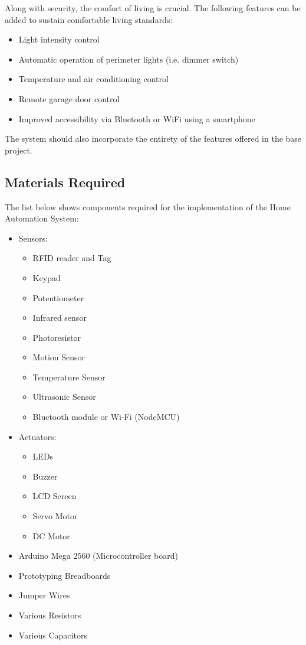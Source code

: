 \documentclass[journal]{IEEEtran}
\begin{document}
Along with security, the comfort of living is crucial. The following features can be added to sustain comfortable living standards:
\begin{itemize}
    \item {Light intensity control}
    \item {Automatic operation of perimeter lights (i.e. dimmer switch)}
    \item {Temperature and air conditioning control}
    \item {Remote garage door control}
    \item {Improved accessibility via Bluetooth or WiFi using a smartphone}
\end{itemize}
The system should also incorporate the entirety of the features offered in the base project.

\subsection{Materials Required}
The list below shows components required for the implementation of the Home Automation System:
\begin{itemize}
	\item{Sensors:}
	\begin{itemize}
		\item{RFID reader and Tag}
		\item{Keypad}
		\item{Potentiometer}
		\item{Infrared sensor}
		\item{Photoresistor}
		\item{Motion Sensor}
		\item{Temperature Sensor}
		\item{Ultrasonic Sensor}
		\item{Bluetooth module or Wi-Fi (NodeMCU)}
	\end{itemize}
	\item{Actuators:}
	\begin{itemize}
		\item{LEDs}
		\item{Buzzer}
		\item{LCD Screen}
		\item{Servo Motor}
		\item{DC Motor}
	\end{itemize}
	\item{Arduino Mega 2560 (Microcontroller board)}
	\item{Prototyping Breadboards}
	\item{Jumper Wires}
	\item{Various Resistors}
	\item{Various Capacitors}
\end{itemize}
\end{document}
